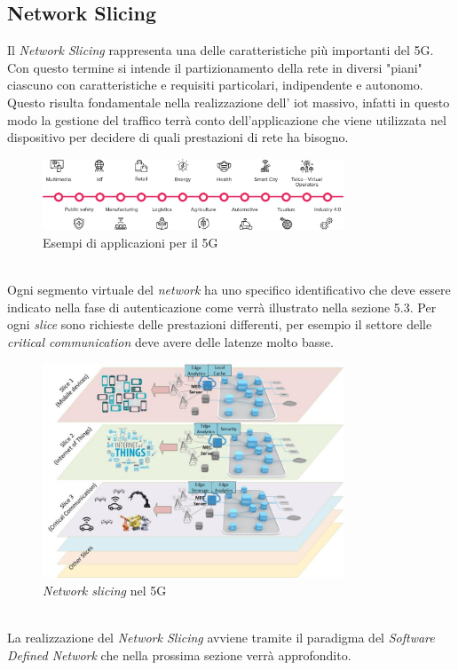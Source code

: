 \clearpage

\subsection{Network Slicing}
Il \textit{Network Slicing} rappresenta una delle caratteristiche più importanti del 5G. Con questo termine si intende il partizionamento della
rete in diversi "piani" ciascuno con caratteristiche e requisiti particolari, indipendente e autonomo. Questo risulta fondamentale nella realizzazione 
dell' \gls{iot} massivo, infatti in questo modo la gestione del traffico terrà conto dell'applicazione che viene utilizzata nel dispositivo per decidere di quali prestazioni di rete ha bisogno. 
\begin{figure}[ht]
    \centering
    \includegraphics[width=0.8\textwidth]{images/5g-eg-of-use.png}
    \caption{Esempi di applicazioni per il 5G}
\end{figure}\\
Ogni segmento virtuale del \textit{network} ha uno specifico identificativo che deve essere indicato nella fase di autenticazione come verrà illustrato nella sezione 5.3. Per ogni \textit{slice} sono 
richieste delle prestazioni differenti, per esempio il settore delle \textit{critical communication} deve avere delle latenze molto basse.
\begin{figure}[ht]
    \centering
    \includegraphics[width=0.8\textwidth]{images/5g-slicing.jpg}
    \caption{\textit{Network slicing} nel 5G}
\end{figure}\\
La realizzazione del \textit{Network Slicing} avviene tramite il paradigma del \textit{Software Defined Network} che nella prossima sezione verrà approfondito.

